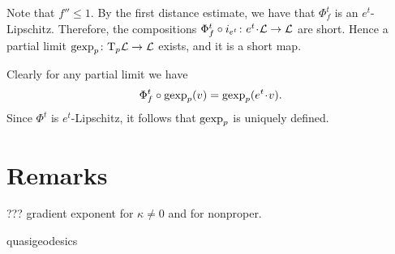 Note that $f''\le 1$.
By the first distance estimate, we have that $\Phi^t_{f}$ is an $e^t$-Lipschitz.
Therefore, the compositions $\Phi^t_{f}\circ i_{e^t}\:e^t{\cdot} \spc{L}\to \spc{L}$ are short. 
Hence a partial limit $\operatorname{\rm gexp}\nolimits_p\colon\mathrm{T}_p
\mathcal{L}\to \mathcal{L}$ exists, and it is a short map.

Clearly for any partial limit we have
\[\Phi^t_f\circ\gexp_p(v)=\gexp_p(e^t\cdot v).\]
Since $\Phi^t$ is $e^t$-Lipschitz, it follows that $\operatorname{\rm gexp}\nolimits_p$ is uniquely
defined.
\qeds

\section{Remarks}

??? gradient exponent for $\kappa\ne 0$
and for nonproper.

quasigeodesics
